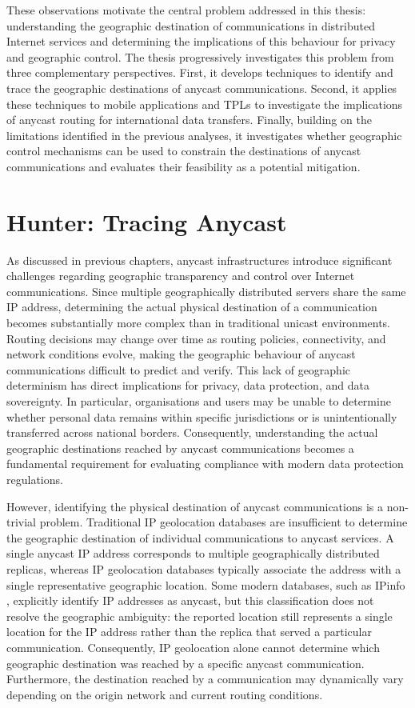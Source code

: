 \documentclass[
A4paper,                %
twoside,                %
openright,              %
chapterprefix=true,     %
12pt,                   %
headings=normal,        %
titlepage=on            %
]{book}
\begin{document}
These observations motivate the central problem addressed in this thesis: understanding the geographic destination of communications in distributed Internet services and determining the implications of this behaviour for privacy and geographic control. The thesis progressively investigates this problem from three complementary perspectives. First, it develops techniques to identify and trace the geographic destinations of anycast communications. Second, it applies these techniques to mobile applications and TPLs to investigate the implications of anycast routing for international data transfers. Finally, building on the limitations identified in the previous analyses, it investigates whether geographic control mechanisms can be used to constrain the destinations of anycast communications and evaluates their feasibility as a potential mitigation.
 \newpage 
 \newpage \chapter{Hunter: Tracing Anycast}
\label{ch:hunter}

As discussed in previous chapters, anycast infrastructures introduce significant challenges regarding geographic transparency and control over Internet communications. Since multiple geographically distributed servers share the same IP address, determining the actual physical destination of a communication becomes substantially more complex than in traditional unicast environments. Routing decisions may change over time as routing policies, connectivity, and network conditions evolve, making the geographic behaviour of anycast communications difficult to predict and verify. This lack of geographic determinism has direct implications for privacy, data protection, and data sovereignty. In particular, organisations and users may be unable to determine whether personal data remains within specific jurisdictions or is unintentionally transferred across national borders. Consequently, understanding the actual geographic destinations reached by anycast communications becomes a fundamental requirement for evaluating compliance with modern data protection regulations.

However, identifying the physical destination of anycast communications is a non-trivial problem. Traditional IP geolocation databases are insufficient to determine the geographic destination of individual communications to anycast services. A single anycast IP address corresponds to multiple geographically distributed replicas, whereas IP geolocation databases typically associate the address with a single representative geographic location. Some modern databases, such as IPinfo \cite{IPIPinfo}, explicitly identify IP addresses as anycast, but this classification does not resolve the geographic ambiguity: the reported location still represents a single location for the IP address rather than the replica that served a particular communication. Consequently, IP geolocation alone cannot determine which geographic destination was reached by a specific anycast communication. Furthermore, the destination reached by a communication may dynamically vary depending on the origin network and current routing conditions.
\end{document}
